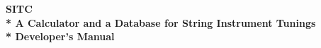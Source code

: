 \begin{titlepage}
	\centering\vspace*{\fill}\begin{minipage}{0.5\linewidth}
		\centering
		\hRule
		\vspace*{\baselineskip}
		\bf
		{\huge SITC}\\*
		{\large A Calculator and a Database for String Instrument Tunings}\\*
		{\footnotesize Developer's Manual}
		\vspace*{\baselineskip}
		\hRule
	\end{minipage}\vspace*{\fill}
\end{titlepage}
